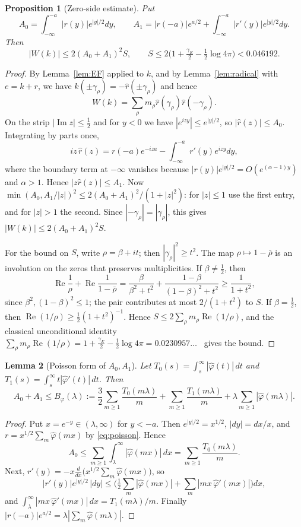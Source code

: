 \documentclass[11pt]{amsart}
\newtheorem{proposition}{Proposition}[section]
\newtheorem{lemma}[proposition]{Lemma}
\theoremstyle{definition}
\theoremstyle{remark}
\numberwithin{equation}{section}
\begin{document}
\begin{proposition}[Zero-side estimate]\label{prop:zero}
Put
\[
A_0=\int_{-\infty}^{-a}|r(y)|e^{|y|/2}dy,\qquad A_1=|r(-a)|e^{a/2}+\int_{-\infty}^{-a}|r'(y)|e^{|y|/2}dy .
\]
Then
\[
|W(k)|\le2(A_0+A_1)^2S,\qquad S\le2\big(1+\tfrac{\gamma_E}{2}-\tfrac12\log4\pi\big)<0.046192 .
\]
\end{proposition}
\begin{proof}
By Lemma~\ref{lem:EF} applied to $k$, and by Lemma~\ref{lem:radical} with $e=k+r$, we have $\hat k(\pm\gamma_\rho)=-\hat r(\pm\gamma_\rho)$ and hence
\[
W(k)=\sum_\rho m_\rho\hat r(\gamma_\rho)\hat r(-\gamma_\rho).
\]
On the strip $|\operatorname{Im}z|\le\frac12$ and for $y<0$ we have $|e^{izy}|\le e^{|y|/2}$, so $|\hat r(z)|\le A_0$. Integrating by parts once,
\[
iz\,\hat r(z)=r(-a)e^{-iza}-\int_{-\infty}^{-a}r'(y)e^{izy}dy,
\]
where the boundary term at $-\infty$ vanishes because $|r(y)|e^{|y|/2}=O(e^{(\alpha-1)y})$ and $\alpha>1$. Hence $|z\hat r(z)|\le A_1$. Now $\min(A_0,A_1/|z|)^2\le2(A_0+A_1)^2/(1+|z|^2)$: for $|z|\le1$ use the first entry, and for $|z|>1$ the second. Since $|{-\gamma_\rho}|=|\gamma_\rho|$, this gives $|W(k)|\le2(A_0+A_1)^2S$.

For the bound on $S$, write $\rho=\beta+it$; then $|\gamma_\rho|^2\ge t^2$. The map $\rho\mapsto1-\bar\rho$ is an involution on the zeros that preserves multiplicities. If $\beta\ne\frac12$, then
\[
\operatorname{Re}\frac1\rho+\operatorname{Re}\frac1{1-\bar\rho}=\frac{\beta}{\beta^2+t^2}+\frac{1-\beta}{(1-\beta)^2+t^2}\ge\frac1{1+t^2},
\]
since $\beta^2,(1-\beta)^2\le1$; the pair contributes at most $2/(1+t^2)$ to $S$. If $\beta=\frac12$, then $\operatorname{Re}(1/\rho)\ge\frac12(1+t^2)^{-1}$. Hence $S\le2\sum_\rho m_\rho\operatorname{Re}(1/\rho)$, and the classical unconditional identity $\sum_\rho m_\rho\operatorname{Re}(1/\rho)=1+\frac{\gamma_E}2-\frac12\log4\pi=0.0230957\ldots$~\cite[Ch.~12]{Davenport} gives the bound.
\end{proof}

\begin{lemma}[Poisson form of $A_0,A_1$]\label{lem:F5}
Let $T_0(s)=\int_s^\infty|\hat\varphi(t)|\,dt$ and $T_1(s)=\int_s^\infty t|\hat\varphi'(t)|\,dt$. Then
\[
A_0+A_1\le B_\varphi(\lambda):=\frac32\sum_{m\ge1}\frac{T_0(m\lambda)}m+\sum_{m\ge1}\frac{T_1(m\lambda)}m+\lambda\sum_{m\ge1}|\hat\varphi(m\lambda)| .
\]
\end{lemma}
\begin{proof}
Put $x=e^{-y}\in(\lambda,\infty)$ for $y<-a$. Then $e^{|y|/2}=x^{1/2}$, $|dy|=dx/x$, and $r=x^{1/2}\sum_m\hat\varphi(mx)$ by \eqref{eq:poisson}. Hence
\[
A_0\le\sum_{m\ge1}\int_\lambda^\infty|\hat\varphi(mx)|\,dx=\sum_{m\ge1}\frac{T_0(m\lambda)}m .
\]
Next, $r'(y)=-x\frac{d}{dx}\big(x^{1/2}\sum_m\hat\varphi(mx)\big)$, so
\[
|r'(y)|e^{|y|/2}\,|dy|\le\Big(\tfrac12\sum_m|\hat\varphi(mx)|+\sum_m|mx\,\hat\varphi'(mx)|\Big)dx,
\]
and $\int_\lambda^\infty|mx\,\hat\varphi'(mx)|\,dx=T_1(m\lambda)/m$. Finally $|r(-a)|e^{a/2}=\lambda|\sum_m\hat\varphi(m\lambda)|$.
\end{proof}
\end{document}
